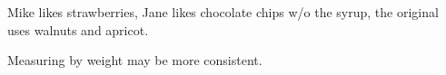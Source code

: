 \begin{variation}
\item Mike likes strawberries, Jane likes chocolate chips w/o the syrup, the original \cite{joyofcooking2006} uses walnuts and apricot.
\end{variation}


\begin{experiments}
\item Measuring by weight may be more consistent.
\end{experiments}
\recipeend
